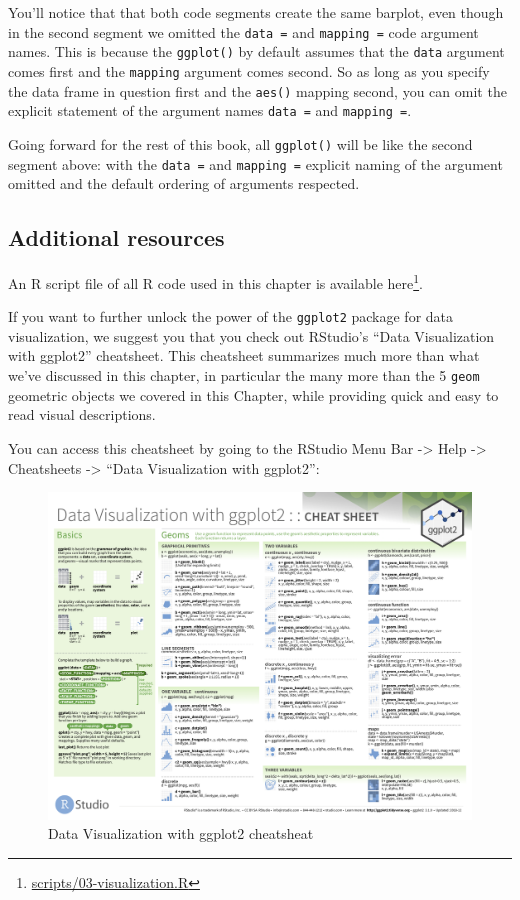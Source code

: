 \documentclass[12pt, krantz2,]{krantz}
\renewcommand{\href}[2]{#2\footnote{\url{#1}}}
\begin{document}
You'll notice that that both code segments create the same barplot, even though in the second segment we omitted the \texttt{data\ =} and \texttt{mapping\ =} code argument names. This is because the \texttt{ggplot()} by default assumes that the \texttt{data} argument comes first and the \texttt{mapping} argument comes second. So as long as you specify the data frame in question first and the \texttt{aes()} mapping second, you can omit the explicit statement of the argument names \texttt{data\ =} and \texttt{mapping\ =}.

Going forward for the rest of this book, all \texttt{ggplot()} will be like the second segment above: with the \texttt{data\ =} and \texttt{mapping\ =} explicit naming of the argument omitted and the default ordering of arguments respected.

\hypertarget{additional-resources-1}{%
\subsection{Additional resources}\label{additional-resources-1}}

An R script file of all R code used in this chapter is available \href{scripts/03-visualization.R}{here}.

If you want to further unlock the power of the \texttt{ggplot2} package for data visualization, we suggest you that you check out RStudio's ``Data Visualization with ggplot2'' cheatsheet. This cheatsheet summarizes much more than what we've discussed in this chapter, in particular the many more than the 5 \texttt{geom} geometric objects we covered in this Chapter, while providing quick and easy to read visual descriptions.

You can access this cheatsheet by going to the RStudio Menu Bar -\textgreater{} Help -\textgreater{} Cheatsheets -\textgreater{} ``Data Visualization with ggplot2'':

\begin{figure}

{\centering \includegraphics[width=\textwidth]{images/ggplot_cheatsheet-1} 

}

\caption{Data Visualization with ggplot2 cheatsheat}\label{fig:ggplot-cheatsheet}
\end{figure}
\end{document}
